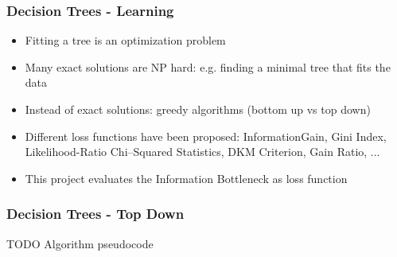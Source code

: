 \begin{frame}
   \frametitle{Decision Trees - Learning}  
   \begin{itemize}
   \item Fitting a tree is an optimization problem
   \item Many exact solutions are NP hard: e.g. finding a minimal tree that fits the data
   \item Instead of exact solutions: greedy algorithms (bottom up vs top down)
   \item Different loss functions have been proposed: \newline
   InformationGain, Gini Index,  Likelihood-Ratio Chi–Squared Statistics, DKM Criterion, Gain Ratio, ...
   \item This project evaluates the Information Bottleneck as loss function 
   \end{itemize}
\end{frame}


\begin{frame}
   \frametitle{Decision Trees - Top Down}  
   TODO Algorithm pseudocode
\end{frame}